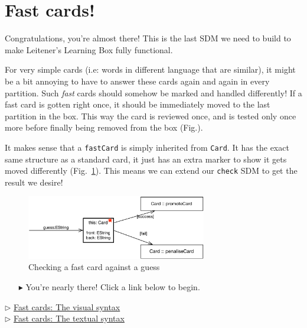\newpage
\section{Fast cards!}
\genHeader
\hypertarget{sec:fastCard}{}

Congratulations, you're almost there! This is the last SDM we need to build to make Leitener's Learning Box fully functional.

For very simple cards (i.e: words in different language that are similar), it might be a bit annoying to have to answer these cards again and again in every
partition. Such \emph{fast} cards should somehow be marked and handled differently! If a fast card is gotten right once, it should be immediately moved to the
last partition in the box. This way the card is reviewed once, and is tested only once more before finally being removed from the box (Fig.).

It makes sense that a \texttt{fastCard} is simply inherited from \texttt{Card}. It has the exact same structure as a standard card, it just has an extra marker
to show it gets moved differently (Fig.~\ref{fig:goal_fastCard}). This means we can extend our \texttt{check} SDM to get the result we desire!

\begin{figure}[htbp]
	\centering
    \includegraphics[width=0.7\textwidth]{goal_fastCard}
	\caption{Checking a fast card against a guess}
	\label{fig:goal_fastCard}
\end{figure}
\FloatBarrier


\vspace{0.5cm}
\begin{itemize}
\item[$\blacktriangleright$] You're nearly there! Click a link below to begin.
\end{itemize}

\begin{center} {$\triangleright$ \hyperlink{fastCard vis}{Fast cards: The visual syntax}}%
\\ \vspace{0.5cm}
{$\triangleright$ \hyperlink{fastCard tex}{Fast cards: The textual syntax}}\end{center} 
 


